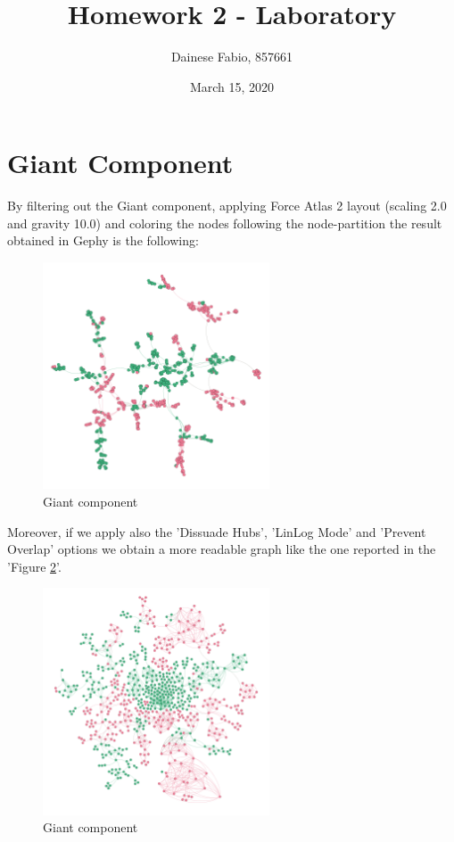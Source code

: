 \documentclass{article}
\title{Homework 2 - Laboratory}
\author{Dainese Fabio, 857661}
\date{March 15, 2020}
\begin{document}
\maketitle

\section{Giant Component}
    By filtering out the Giant component, applying Force Atlas 2 layout (scaling 2.0 and gravity 10.0) and coloring the nodes following the node-partition the result obtained in Gephy is the following:

    \begin{figure}[H]
        \centering
        \includegraphics[width=0.6\textwidth]{1.0.png}
        \caption{Giant component}
        \label{fig:figure-1}
    \end{figure}
    
    \noindent Moreover, if we apply also the 'Dissuade Hubs', 'LinLog Mode' and 'Prevent Overlap' options we obtain a more readable graph like the one reported in the 'Figure \ref{fig:figure-1.1}'.
    
    \begin{figure}[H]
        \centering
        \includegraphics[width=0.6\textwidth]{1.1.png}
        \caption{Giant component}
        \label{fig:figure-1.1}
    \end{figure}
\end{document}
